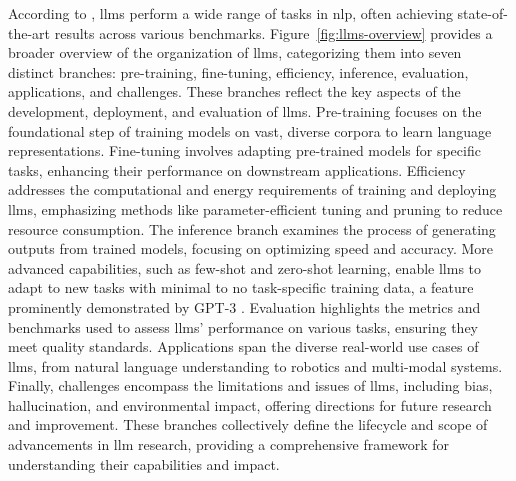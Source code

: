 According to \textcite{Chang2024}, \glspl{llm} perform a wide range of tasks in \gls{nlp}, often achieving state-of-the-art results across various benchmarks.
Figure~\ref{fig:llms-overview} provides a broader overview of the organization of \glspl{llm}, categorizing them into seven distinct branches: pre-training, fine-tuning, efficiency, inference, evaluation, applications, and challenges.
These branches reflect the key aspects of the development, deployment, and evaluation of \glspl{llm}.
Pre-training focuses on the foundational step of training models on vast, diverse corpora to learn language representations.
Fine-tuning involves adapting pre-trained models for specific tasks, enhancing their performance on downstream applications.
Efficiency addresses the computational and energy requirements of training and deploying \glspl{llm}, emphasizing methods like parameter-efficient tuning and pruning to reduce resource consumption.
The inference branch examines the process of generating outputs from trained models, focusing on optimizing speed and accuracy.
More advanced capabilities, such as few-shot and zero-shot learning, enable \glspl{llm} to adapt to new tasks with minimal to no task-specific training data, a feature prominently demonstrated by GPT-3 \cite{NEURIPS2020_1457c0d6}.
Evaluation highlights the metrics and benchmarks used to assess \glspl{llm}' performance on various tasks, ensuring they meet quality standards.
Applications span the diverse real-world use cases of \glspl{llm}, from natural language understanding to robotics and multi-modal systems.
Finally, challenges encompass the limitations and issues of \glspl{llm}, including bias, hallucination, and environmental impact, offering directions for future research and improvement.
These branches collectively define the lifecycle and scope of advancements in \gls{llm} research, providing a comprehensive framework for understanding their capabilities and impact.

